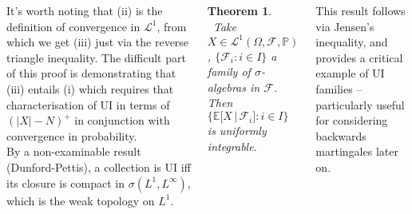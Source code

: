 \documentclass{tikzposter} %
\newtheorem{theorem}{Theorem}
\newtheorem{definition}{Definition}
\begin{document}
\begin{columns}
{    It's worth noting that (ii) is the definition of convergence in $\mathcal{L}^{1}$, from which we get (iii) just via the reverse triangle inequality. The difficult part of this proof is demonstrating that (iii) entails (i) which requires that characterisation of UI in terms of $(|X|-N)^{+}$ in conjunction with convergence in probability. \\

    By a non-examinable result (Dunford-Pettis), a collection is UI iff its closure is compact in $\sigma(L^{1},L^{\infty})$, which is the weak topology on $L^{1}$. \\

    \begin{theorem}
    \ Take $X \in \mathcal{L}^{1}(\Omega, \mathcal{F}, \mathbb{P})$, $\{\mathcal{F}_{i} : i \in I\}$ a family of $\sigma$-algebras in $\mathcal{F}$. Then $\big\{\mathbb{E}\big[X \,|\, \mathcal{F}_{i}\big] : i \in I\big\}$ is uniformly integrable.
    \end{theorem}
    \hphantom{}

    This result follows via Jensen's inequality, and provides a critical example of UI families -- particularly useful for considering backwards martingales later on.
  }

\end{columns}
\end{document}
